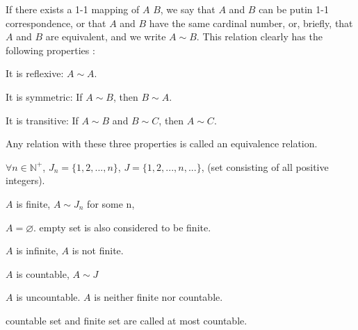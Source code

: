 \begin{mydef}
    \label{mydef:2.3}
    If there exists a 1-1 mapping of $A$  $B$, we say that $A$ and $B$ can be putin 1-1 correspondence, or that $A$ and $B$ have the same cardinal number, or, briefly, that $A$ and $B$ are equivalent, and we write $A\sim B$. This relation
    clearly has the following properties :

    It is reflexive: $A\sim A$.

    It is symmetric: If $A\sim B$, then $B\sim A$.

    It is transitive: If $A\sim B$ and $B\sim C$, then $A\sim C$.

    Any relation with these three properties is called an equivalence relation.
\end{mydef}

\begin{mydef}
    \label{mydef:2.4}
    $\forall n\in \mathbb{N}^+$, $J_n = \{1,2,...,n\}$, $J = \{1,2,...,n,...\}$, (set consisting of all positive integers).

    $A$ is finite, $A\sim J_n$ for some n,

    $A = \varnothing$. empty set is also considered to be finite.

    $A$ is infinite, $A$ is not finite.

    $A$ is countable, $A \sim J$

    $A$ is uncountable. $A$ is neither finite nor countable.

    countable set and finite set are called at most countable.
\end{mydef}


